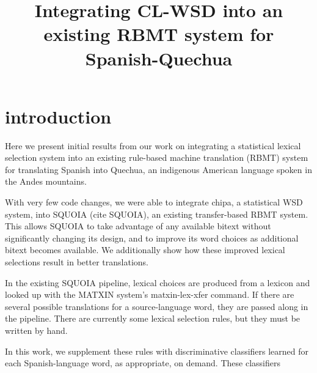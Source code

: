 \documentclass[10pt, a4paper]{article}
\title{Integrating CL-WSD into an existing RBMT system for Spanish-Quechua}
\begin{document}
\maketitleabstract


\section{introduction}
Here we present initial results from our work on integrating a statistical
lexical selection system into an existing rule-based machine translation (RBMT)
system for translating Spanish into Quechua, an indigenous American language
spoken in the Andes mountains.


With very few code changes, we were able to integrate chipa, a statistical WSD
system, into SQUOIA (cite SQUOIA), an existing transfer-based RBMT system. This
allows SQUOIA to take advantage of any available bitext without significantly
changing its design, and to improve its word choices as additional bitext
becomes available. We additionally show how these improved lexical selections
result in better translations.


In the existing SQUOIA pipeline, lexical choices are produced from a lexicon
and looked up with the MATXIN system's matxin-lex-xfer command. If there are
several possible translations for a source-language word, they are passed along
in the pipeline. There are currently some lexical selection rules, but they
must be written by hand.


In this work, we supplement these rules with discriminative classifiers learned
for each Spanish-language word, as appropriate, on demand. These classifiers 
\end{document}
